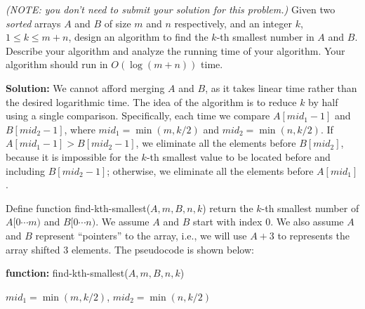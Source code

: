 \documentclass[11pt]{article}
\begin{document}
\begin{qunlist}
\emph{(NOTE: you don't need to submit your solution for this problem.)}
Given two \emph{sorted} arrays $A$ and $B$ of size $m$ and $n$ respectively, and an integer $k$, $1\le k \le m + n$,
design an algorithm to find the $k$-th smallest number in $A$ and $B$.
Describe your algorithm and analyze the running time of your algorithm.
Your algorithm should run in $O(\log(m+n))$ time.



{\bf Solution:} We cannot afford merging $A$ and $B$, as it takes linear time rather than the desired logarithmic time.
The idea of the algorithm is to reduce $k$ by half using a single comparison.
Specifically, each time we compare $A[mid_1-1]$ and $B[mid_2-1]$, where $mid_1=\min(m,k/2)$
and $mid_2=\min(n,k/2)$. If $A[mid_1-1]>B[mid_2-1]$, we eliminate all the elements
before $B[mid_2]$, because it is impossible for the $k$-th smallest value to be
located before and including $B[mid_2-1]$; otherwise, we eliminate all the elements before
$A[mid_1]$.

Define function find-kth-smallest($A, m, B, n, k$) return the $k$-th smallest
number of $A[0\cdots m)$ and $B[0\cdots n)$.
We assume $A$ and $B$ start with index 0. We also assume $A$ and $B$ represent ``pointers'' to the array,
i.e., we will use $A + 3$ to represents the array shifted 3 elements.
The pseudocode is shown below:

\begin{algorithm}[H]
{\bf function: } find-kth-smallest($A, m, B, n,k$) \\

$mid_1=\min(m,k/2)$, $mid_2=\min(n,k/2)$\;
\end{algorithm}



\end{qunlist}
\end{document}
